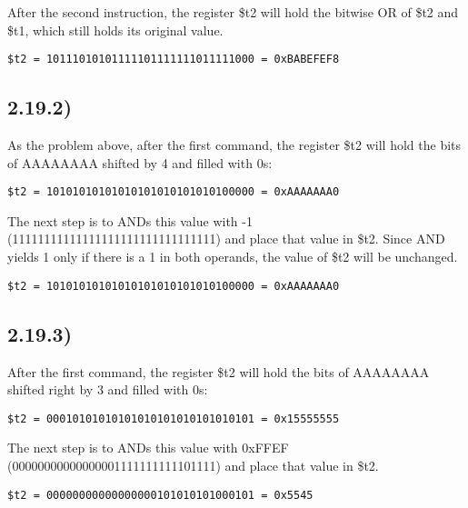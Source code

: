 \documentclass[a4paper,11pt]{article}
\begin{document}
\noindent After the second instruction, the register \$t2 will hold the bitwise OR of \$t2 and \$t1, which still holds its original value.
\begin{verbatim}
$t2 = 10111010101111101111111011111000 = 0xBABEFEF8
\end{verbatim}


\subsection*{2.19.2)}
As the problem above, after the first command, the register \$t2 will hold the bits of AAAAAAAA shifted by 4 and filled with 0s: 
\begin{verbatim}
$t2 = 10101010101010101010101010100000 = 0xAAAAAAA0
\end{verbatim}

\noindent The next step is to ANDs this value with -1 (11111111111111111111111111111111) and place that value in \$t2.  Since AND yields 1 only if there is a 1 in both operands, the value of \$t2 will be unchanged.

\begin{verbatim}
$t2 = 10101010101010101010101010100000 = 0xAAAAAAA0
\end{verbatim}


\subsection*{2.19.3)}
After the first command, the register \$t2 will hold the bits of AAAAAAAA shifted right by 3 and filled with 0s: 
\begin{verbatim}
$t2 = 00010101010101010101010101010101 = 0x15555555
\end{verbatim}

\noindent The next step is to ANDs this value with 0xFFEF (00000000000000001111111111101111) and place that value in \$t2.

\begin{verbatim}
$t2 = 00000000000000000101010101000101 = 0x5545
\end{verbatim}

\end{document}
